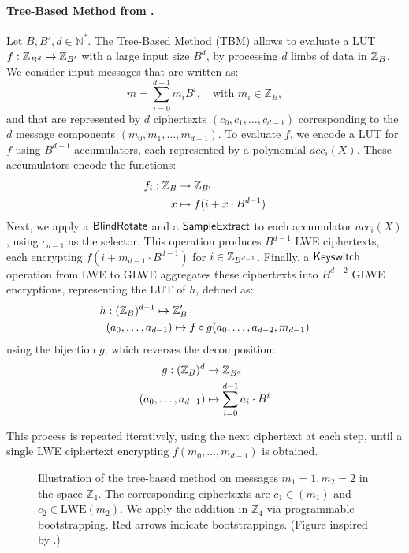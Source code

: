 \paragraph{Tree-Based Method from \cite{DBLP:conf/wahc/TramaCBS23}.}
\label{prim:tbb}

Let $B, B', d \in \mathbb N^*$. The Tree-Based Method (TBM) allows to evaluate a LUT $f: \mathbb{Z}_{B^d} \mapsto \mathbb{Z}_ {B'}$ with a large input size $B^d$, by processing $d$ limbs of data in $\mathbb{Z}_B$. We consider input messages that are written as:
$$
    m = \sum_{i=0}^{d-1} m_i B^i, \quad \text{with } m_i \in \mathbb{Z}_B,
$$
and that are represented by $d$ ciphertexts $(c_0, c_1, \dots, c_{d-1})$ corresponding to the $d$ message components $(m_0, m_1, \dots, m_{d-1})$. 
%
To evaluate $f$, we encode a LUT for $f$ using $B^{d-1}$ accumulators, each represented by a polynomial $acc_i(X)$. These accumulators encode the functions:
%
    \begin{align*}
        f_i: \mathbb{Z}_B &\rightarrow \mathbb{Z}_{B'}\\
             x &\mapsto f(i + x \cdot B^{d-1})
    \end{align*}
%
Next, we apply a $\sf{BlindRotate}$ and a $\sf{SampleExtract}$ to each accumulator $acc_i(X)$, using $c_{d-1}$ as the selector. This operation produces $B^{d-1}$ LWE ciphertexts, each encrypting $f (i + m_{d-1} \cdot B^{d-1})$ for $i \in \mathbb{Z}_{B^{d-1}}$.
%    
Finally, a $\sf{Keyswitch}$ operation from LWE to GLWE aggregates these ciphertexts into $B^{d-2}$ GLWE encryptions, representing the LUT of $h$, defined as:
    \begin{align*}
        h &: (\mathbb{Z}_{B})^{d-1} \mapsto \mathbb{Z}_B' \\
          & (a_0, \dots, a_{d-1}) \mapsto f \circ g(a_0, \dots, a_{d-2}, m_{d-1})
    \end{align*}
using the bijection $g$, which reverses the decomposition:
    \begin{align*}
        g: (\mathbb{Z}_B)^d &\rightarrow \mathbb{Z}_{B^d} \\
           (a_0, \dots, a_{d-1}) &\mapsto \sum_{i=0}^{d-1} a_i \cdot B^i
    \end{align*} 

This process is repeated iteratively, using the next ciphertext at each step, until a single LWE ciphertext encrypting $f(m_0, \dots, m_{d-1})$ is obtained.  

\begin{figure}
    \centering
    \caption{Illustration of the tree-based method on messages  $m_1 = 1, m_2=2$ in the space  $\mathbb{Z}_4$. The corresponding ciphertexts are $c_1 \in \mathrm{}(m_1)$ and $c_2 \in \mathrm{LWE}(m_2)$. We apply the addition in $\mathbb{Z}_4$ via programmable bootstrapping. Red arrows indicate bootstrappings. (Figure inspired by \cite{DBLP:conf/wahc/TramaCBS23}.)}
    \label{fig:my_label}
\end{figure}

